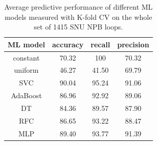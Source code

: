 \begin{table}
  \caption{Average predictive performance of different ML models measured with K-fold CV on the whole set of 1415 SNU NPB loops.}
  \begin{minipage}{\columnwidth}
  \begin{center}
    \begin{tabu}{cccc}
      \hline
      \rowfont{\bfseries}
      ML model & accuracy & recall & precision\\\hline
      constant & 70.32 & 100 & 70.32\\
      uniform & 46.27 & 41.50 & 69.79\\
      SVC & 90.04 & 95.24 & 91.06 \\
      AdaBoost & 86.96 & 92.92 & 89.06 \\
      DT & 84.36 & 89.57 & 87.90 \\
      RFC & 86.65 & 93.22 & 88.47 \\
      MLP & 89.40 & 93.77 & 91.39 \\\hline
      \end{tabu}
  \end{center}
  \end{minipage}
  \label{tab:average_accuracy_models}
  \vspace{-5mm}
\end{table}%


